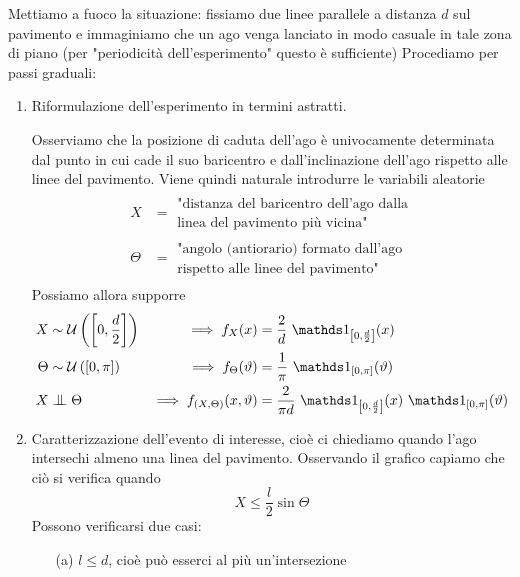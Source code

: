 \Soluzione{}
Mettiamo a fuoco la situazione: fissiamo due linee parallele a distanza $d$ sul pavimento e immaginiamo che un ago venga lanciato in modo casuale in tale zona di piano (per "periodicità dell'esperimento" questo è sufficiente)
Procediamo per passi graduali:
\begin{enumerate}

\item Riformulazione dell'esperimento in termini astratti.

Osserviamo che la posizione di caduta dell'ago è univocamente determinata dal punto in cui cade il suo baricentro e dall'inclinazione dell'ago rispetto alle linee del pavimento. Viene quindi naturale introdurre le variabili aleatorie
\begin{gather*}
\begin{aligned}
X&=\begin{matrix}
\text{"distanza del baricentro dell'ago dalla} \\
\text{linea del pavimento più vicina"}
\end{matrix} \\
\Theta &=\begin{matrix}
\text{"angolo (antiorario) formato dall'ago} \\ 
\text{rispetto alle linee del pavimento"}
\end{matrix}
\end{aligned}
\end{gather*}
Possiamo allora supporre
\begin{align*}
X&\sim\UUU\left(\left[0,\frac{d}{2}\right]\right) &\implies f_X(x)&=\frac{2}{d}\ \Ind_{\left[0,\frac{d}{2}\right]}(x) \\
\Theta&\sim\UUU\left(\left[0,\pi\right]\right) &\implies f_\Theta(\vartheta)&=\frac{1}{\pi}\ \Ind_{\left[0,\pi\right]}(\vartheta) \\
X&\indep\Theta&\implies f_{(X,\Theta)}(x,\vartheta)&=\frac{2}{\pi d}\ \Ind_{\left[0,\frac{d}{2}\right]}(x)\ \Ind_{\left[0,\pi\right]}(\vartheta)
\end{align*}

\item Caratterizzazione dell'evento di interesse, cioè ci chiediamo quando l'ago intersechi almeno una linea del pavimento.
Osservando il grafico capiamo che ciò si verifica quando
\[
\boxed{X\leq\frac{l}{2}\sin\Theta}
\]
Possono verificarsi due casi:
\begin{enumerate}

\item [(a)] $l\leq d$, cioè può esserci al più un'intersezione


\end{enumerate}
\end{enumerate}
